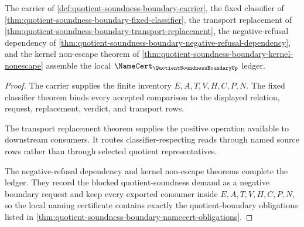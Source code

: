 \begin{theorem}
\label{thm:quotient-soundness-boundary-namecert-ledger}
The carrier of \autoref{def:quotient-soundness-boundary-carrier}, the fixed classifier of \autoref{thm:quotient-soundness-boundary-fixed-classifier}, the transport replacement of \autoref{thm:quotient-soundness-boundary-transport-replacement}, the negative-refusal dependency of \autoref{thm:quotient-soundness-boundary-negative-refusal-dependency}, and the kernel non-escape theorem of \autoref{thm:quotient-soundness-boundary-kernel-nonescape} assemble the local $\NameCert_{\QuotientSoundnessBoundaryUp}$ ledger.
\end{theorem}
\begin{proof}
The carrier supplies the finite inventory $E,A,T,V,H,C,P,N$. The fixed classifier theorem binds every accepted comparison to the displayed relation, request, replacement, verdict, and transport rows.

The transport replacement theorem supplies the positive operation available to downstream consumers. It routes classifier-respecting reads through named source rows rather than through selected quotient representatives.

The negative-refusal dependency and kernel non-escape theorems complete the ledger. They record the blocked quotient-soundness demand as a negative boundary request and keep every exported consumer inside $E,A,T,V,H,C,P,N$, so the local naming certificate contains exactly the quotient-boundary obligations listed in \autoref{thm:quotient-soundness-boundary-namecert-obligations}.
\end{proof}

